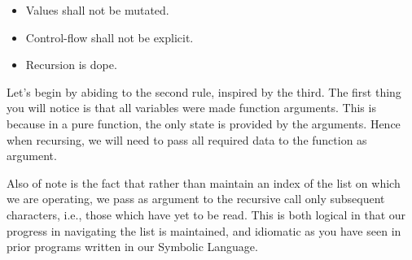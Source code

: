 \documentclass[11pt]{article}
\begin{document}
\begin{itemize}
  \item Values shall not be mutated.
  \item Control-flow shall not be explicit.
  \item Recursion is dope.
\end{itemize}

Let's begin by abiding to the second rule, inspired by the third. The first thing you will notice is that all variables were made function arguments. This is because in a pure function, the only state is provided by the arguments. Hence when recursing, we will need to pass all required data to the function as argument.

Also of note is the fact that rather than maintain an index of the list on which we are operating, we pass as argument to the recursive call only subsequent characters, i.e., those which have yet to be read. This is both logical in that our progress in navigating the list is maintained, and idiomatic as you have seen in prior programs written in our Symbolic Language.
\end{document}
